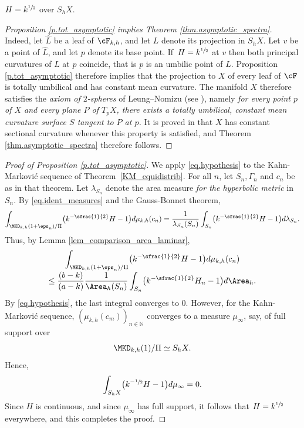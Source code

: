 \begin{prop}\label{p.tot_asymptotic}
$H=k^{\sfrac{1}{2}}$ over $S_hX$.
\end{prop}

\begin{proof}[Proposition \ref{p.tot_asymptotic} implies Theorem \ref{thm.asymptotic_spectra}]
Indeed, let $\hat L$ be a leaf of $\cF_{k,h}$, and let $L$ denote its projection in $S_hX$. Let $v$ be a point of $\hat L$, and let $p$ denote its base point. If~$H=k^{\sfrac{1}{2}}$ at $v$ then both principal curvatures of $L$ at $p$ coincide, that is $p$ is an umbilic point of $L$. Proposition \ref{p.tot_asymptotic} therefore implies that the projection to $X$ of every leaf of $\cF$ is totally umbilical and has constant mean curvature. The manifold $X$ therefore satisfies the \emph{axiom of $2$-spheres} of Leung--Nomizu (see \cite{Leung_Nomizu}), namely \emph{for every point $p$ of $X$ and every plane $P$ of $T_pX$, there exists a totally umbilical, constant mean curvature surface $S$ tangent to $P$ at $p$.} It is proved in \cite{Leung_Nomizu} that $X$ has constant sectional curvature whenever this property is satisfied, and Theorem \ref{thm.asymptotic_spectra} therefore follows.
\end{proof}

\begin{proof}[Proof of Proposition \ref{p.tot_asymptotic}] We apply \eqref{eq.hypothesis} to the Kahn-Markovi\'c sequence of Theo\-rem~\ref{KM_equidistrib}. For all $n$, let $S_n,\Gamma_n$ and $c_n$ be as in that theorem. Let $\lambda_{S_n}$ denote the area measure \emph{for the hyperbolic metric} in $S_n$. By \eqref{eq.ident_measures} and the Gauss-Bonnet theorem,
\begin{equation*}
\int_{\MKD_{k,h}(1+\eps_n)/\Pi}\bigl(k^{-\sfrac{1}{2}}H-1\bigr)d\mu_{k,h}(c_n)=
\frac{1}{\lambda_{S_n}(S_n)}\int_{S_n}\bigl(k^{-\sfrac{1}{2}}H-1\bigr)d\lambda_{S_n}.
\end{equation*}
Thus, by Lemma \ref{lem_comparison_area_laminar},\vspace*{-3pt}
\begin{multline*}
\int_{\MKD_{k,h}(1+\eps_n)/\Pi}\bigl(k^{-\sfrac{1}{2}}H-1\bigr)d\mu_{k,h}(c_n)\\[-3pt]
\leq\frac{(b-k)}{(a-k)}\frac{1}{\Area_h(S_n)}\int_{S_n}\bigl(k^{-\sfrac{1}{2}}H_n-1\bigr)d\Area_h.
\end{multline*}
By \eqref{eq.hypothesis}, the last integral converges to $0$. However, for the Kahn-Markovi\'c sequence, $(\mu_{k,h}(c_m))_{n\in\mathbb{N}}$ converges to a measure $\mu_\infty$, say, of full support over
\[
\MKD_{k,h}(1)/\Pi\simeq\nobreak S_hX.
\]
Hence,
\begin{equation*}
\int_{S_hX}\bigl(k^{-\sfrac{1}{2}}H-1\bigr)d\mu_\infty = 0.
\end{equation*}
Since $H$ is continuous, and since $\mu_\infty$ has full support, it follows that $H=k^{\sfrac{1}{2}}$ everywhere, and this completes the proof.
\end{proof}

